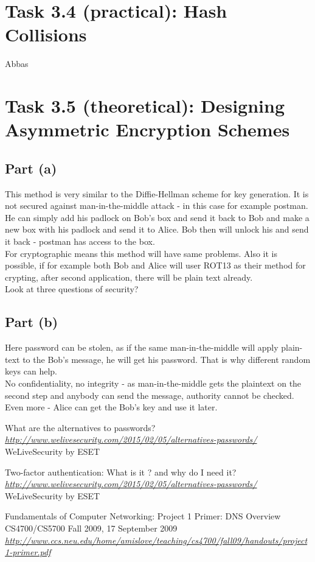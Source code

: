 \documentclass{article}
\begin{document}
\section*{Task 3.4 (practical): Hash Collisions}
Abbas

\section*{Task 3.5 (theoretical): Designing Asymmetric Encryption Schemes}
\subsection*{Part (a)}
This method is very similar to the Diffie-Hellman scheme for key generation. It is not secured against man-in-the-middle attack - in this case for example postman. He can simply add his padlock on Bob's box and send it back to Bob and make a new box with his padlock and send it to Alice. Bob then will unlock his and send it back - postman has access to the box. 
\\
For cryptographic means this method will have same problems. Also it is possible, if for example both Bob and Alice will user ROT13 as their method for crypting, after second application, there will be plain text already.
\\
Look at three questions of security?

\subsection*{Part (b)}
Here password can be stolen, as if the same man-in-the-middle will apply plain-text to the Bob's message, he will get his password. That is why different random keys can help.
\\
No confidentiality, no integrity - as man-in-the-middle gets the plaintext on the second step and anybody can send the message, authority cannot be checked. Even more - Alice can get the Bob's key and use it later.


\begin{thebibliography}{9}

  What are the alternatives to passwords?
  \emph{\url{http://www.welivesecurity.com/2015/02/05/alternatives-passwords/}}
  WeLiveSecurity by ESET
  
  Two-factor authentication: What is it ? and why do I need it?
  \emph{\url{http://www.welivesecurity.com/2015/02/05/alternatives-passwords/}}
  WeLiveSecurity by ESET

 Fundamentals of Computer Networking: Project 1 Primer: DNS Overview
 CS4700/CS5700 Fall 2009, 17 September 2009
 \emph{\url{http://www.ccs.neu.edu/home/amislove/teaching/cs4700/fall09/handouts/project1-primer.pdf}}

\end{thebibliography}
\end{document}
